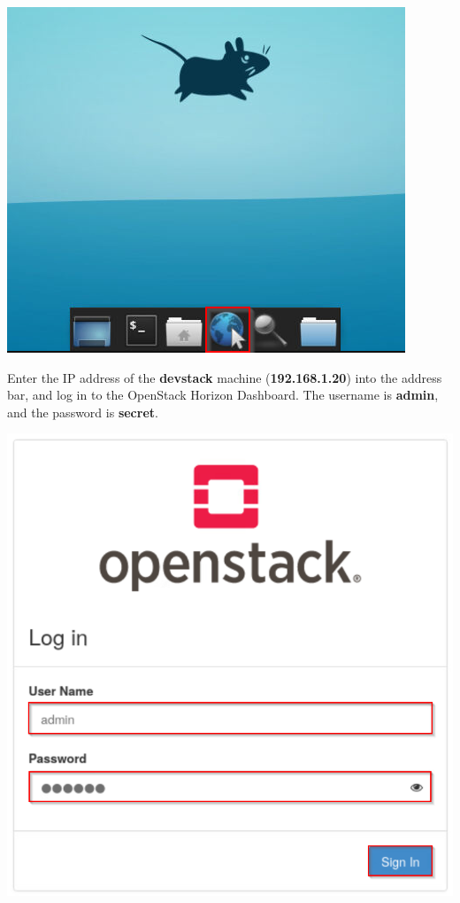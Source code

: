 \documentclass[letterpaper, 12pt]{article}
\begin{document}
\begin{enumerate}
\begin{labstep}
        \begin{center}
            \includegraphics[scale=0.8]{images/part1/step3.png}
        \end{center}
    \end{labstep}

    \begin{labstep}
        Enter the IP address of the \textbf{devstack} machine (\textbf{192.168.1.20}) into the address bar, and log in to the OpenStack Horizon Dashboard.
        The username is \textbf{admin}, and the password is \textbf{secret}.

        \begin{center}
            \includegraphics[scale=0.5]{images/part1/step4.png}
        \end{center}
    \end{labstep}


\end{enumerate}
\end{document}
